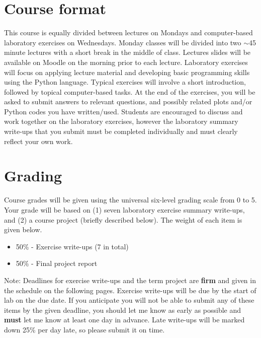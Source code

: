 \documentclass[11pt,a4paper]{article}
\begin{document}
\section*{Course format}
This course is equally divided between lectures on Mondays and computer-based laboratory exercises on Wednesdays.
Monday classes will be divided into two $\sim$45 minute lectures with a short break in the middle of class.
Lectures slides will be available on Moodle on the morning prior to each lecture.
Laboratory exercises will focus on applying lecture material and developing basic programming skills using the Python language.
Typical exercises will involve a short introduction, followed by topical computer-based tasks.
At the end of the exercises, you will be asked to submit answers to relevant questions, and possibly related plots and/or Python codes you have written/used.
Students are encouraged to discuss and work together on the laboratory exercises, however the laboratory summary write-ups that you submit must be completed individually and must clearly reflect your own work.

\section*{Grading}
Course grades will be given using the universal six-level grading scale from 0 to 5.
Your grade will be based on (1) seven laboratory exercise summary write-ups, and (2) a course project (briefly described below).
The weight of each item is given below.
\begin{itemize}
  \item 50\% - Exercise write-ups (7 in total)
  \item 50\% - Final project report
\end{itemize}
Note: Deadlines for exercise write-ups and the term project are \textbf{firm} and given in the schedule on the following pages.
Exercise write-ups will be due by the start of lab on the due date.
If you anticipate you will not be able to submit any of these items by the given deadline, you should let me know as early as possible and \textbf{must} let me know at least one day in advance.
Late write-ups will be marked down 25\% per day late, so please submit it on time.
\end{document}
